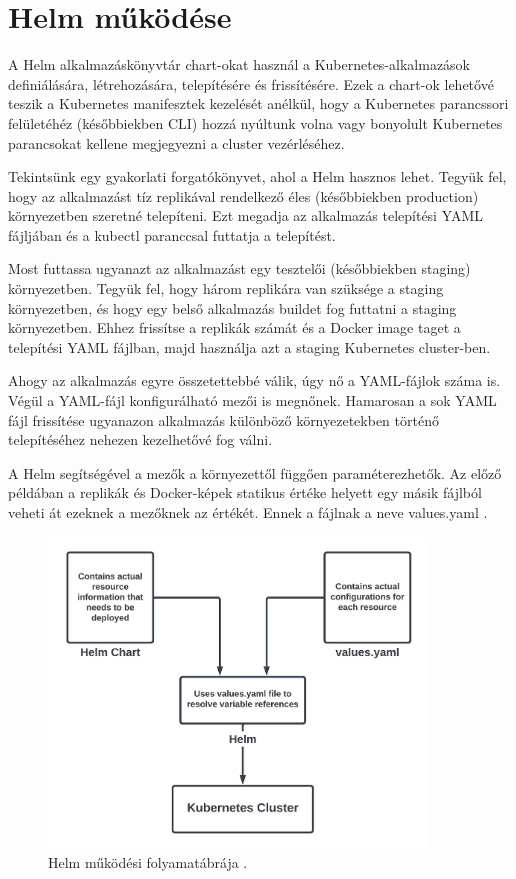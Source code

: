 \section{Helm működése}
A Helm alkalmazáskönyvtár chart-okat használ a Kubernetes-alkalmazások definiálására, létrehozására, telepítésére és frissítésére.
Ezek a chart-ok lehetővé teszik a Kubernetes manifesztek kezelését anélkül, hogy a Kubernetes parancssori felületéhéz (későbbiekben CLI) hozzá nyúltunk volna vagy bonyolult Kubernetes parancsokat kellene megjegyezni a cluster vezérléséhez.

Tekintsünk egy gyakorlati forgatókönyvet, ahol a Helm hasznos lehet.
Tegyük fel, hogy az alkalmazást tíz replikával rendelkező éles (későbbiekben production) környezetben szeretné telepíteni.
Ezt megadja az alkalmazás telepítési YAML fájljában és a kubectl paranccsal futtatja a telepítést.

Most futtassa ugyanazt az alkalmazást egy tesztelői (későbbiekben staging) környezetben.
Tegyük fel, hogy három replikára van szüksége a staging környezetben, és hogy egy belső alkalmazás buildet fog futtatni a staging környezetben.
Ehhez frissítse a replikák számát és a Docker image taget a telepítési YAML fájlban, majd használja azt a staging Kubernetes cluster-ben.

Ahogy az alkalmazás egyre összetettebbé válik, úgy nő a YAML-fájlok száma is.
Végül a YAML-fájl konfigurálható mezői is megnőnek.
Hamarosan a sok YAML fájl frissítése ugyanazon alkalmazás különböző környezetekben történő telepítéséhez nehezen kezelhetővé fog válni.

A Helm segítségével a mezők a környezettől függően paraméterezhetők.
Az előző példában a replikák és Docker-képek statikus értéke helyett egy másik fájlból veheti át ezeknek a mezőknek az értékét.
Ennek a fájlnak a neve values.yaml \cite{helm}.

\begin{figure}[ht]
    \centering
         \includegraphics[width=0.9\textwidth]{figures/helm/helm-overview.png}
          \caption{Helm működési folyamatábrája \cite{helm}.}
           \label{helm-overview}
\end{figure}

